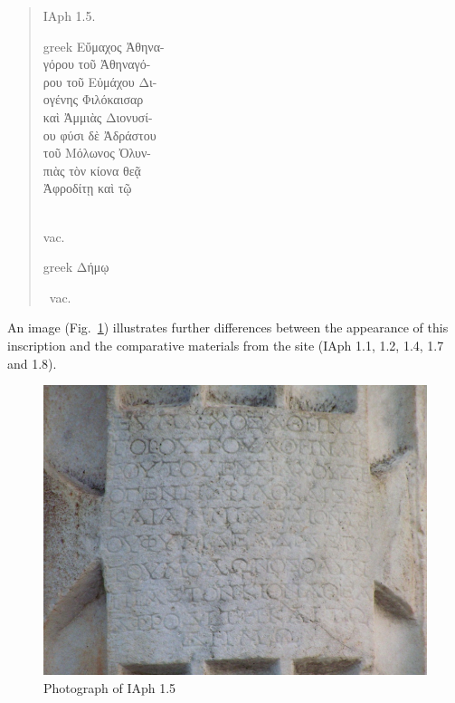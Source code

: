 \documentclass[amsthm,ebook]{saparticle}
\begin{document}
\begin{quotation}
\noindent IAph 1.5.\\
\begin{otherlanguage*}{greek}
\noindent Εὔμαχος Ἀθηνα-\\
γόρου τοῦ Ἀθηναγό-\\
ρου τοῦ Εὐμάχου Δι-\\
ογένης Φιλόκαισαρ\\
 καὶ Ἀμμιὰς Διονυσί-\\
ου φύσι δὲ Ἀδράστου\\
τοῦ Μόλωνος Ὀλυν-\\
πιὰς τὸν κίονα θεᾷ\\
Ἀφροδίτῃ καὶ τῷ
\end{otherlanguage*} \\
vac. \begin{otherlanguage*}{greek}
Δήμῳ
\end{otherlanguage*} vac.
\end{quotation}

An image (Fig.~\ref{fig:3}) illustrates further differences between the appearance of this inscription
and the comparative materials from the site (IAph 1.1, 1.2, 1.4, 1.7 and 1.8). 




\begin{figure}[!bp]
\centering
 \includegraphics[width=\columnwidth]{PaperproposalforEAGLEfinal-img003.jpg}
\caption{Photograph of IAph 1.5}
\label{fig:3}
\end{figure}
\end{document}
